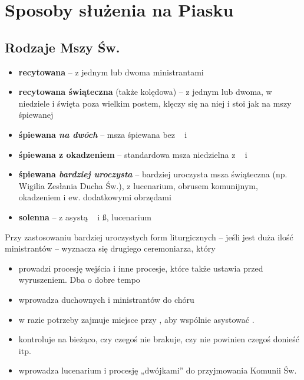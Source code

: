 
\section{Sposoby służenia na Piasku}

	\subsection{Rodzaje Mszy Św.}
		
		\begin{itemize}
			\item \textbf{recytowana} -- z jednym lub dwoma ministrantami
			\item \textbf{recytowana świąteczna} (także kolędowa) -- z jednym lub dwoma, w
			niedziele i święta poza wielkim postem, klęczy się na niej i stoi jak na mszy
			śpiewanej
			\item \textbf{śpiewana \textit{na dwóch}} -- msza śpiewana bez \cc~ i \tt~
			\item \textbf{śpiewana z okadzeniem} -- standardowa msza niedzielna z
			\cc~ i \tt~
			\item \textbf{ śpiewana \textit{bardziej uroczysta}} -- bardziej uroczysta msza świąteczna	(np. Wigilia Zesłania Ducha Św.), z lucenarium, obrusem komunijnym, okadzeniem i ew. dodatkowymi obrzędami
			\item \textbf{solenna} -- z asystą \dd~ i \ss, lucenarium
		\end{itemize}
	
		\noindent Przy zastosowaniu bardziej uroczystych form liturgicznych -- jeśli jest duża ilość
		ministrantów -- wyznacza się drugiego ceremoniarza, który
		\begin{itemize}
			\item prowadzi procesję wejścia i inne procesje, które także ustawia przed wyruszeniem. Dba o dobre tempo
			\item wprowadza duchownych i ministrantów do chóru
			\item w razie potrzeby zajmuje miejsce przy , aby wspólnie asystować \ii.
			\item kontroluje na bieżąco, czy czegoś nie brakuje, czy nie powinien czegoś donieść itp.
			\item wprowadza lucenarium i procesję „dwójkami” do przyjmowania Komunii Św.
		\end{itemize}
		